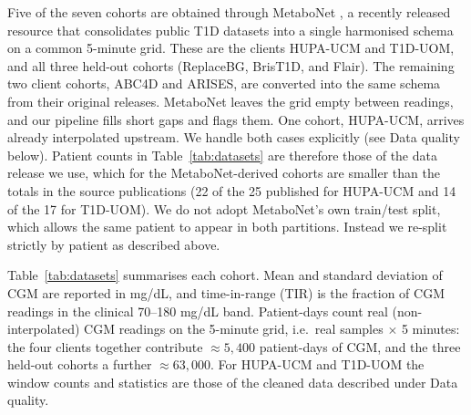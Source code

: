 \documentclass[10pt,letterpaper]{article}
\begin{document}
Five of the seven cohorts are obtained through MetaboNet
\cite{wolff2026metabonet}, a recently released resource that consolidates
public T1D datasets into a single harmonised schema on a common 5-minute grid.
These are the clients HUPA-UCM and T1D-UOM, and all three held-out cohorts
(ReplaceBG, BrisT1D, and Flair). The remaining two client cohorts, ABC4D and
ARISES, are converted into the same schema from their original releases.
MetaboNet leaves the grid empty between readings, and our pipeline fills short
gaps and flags them. One cohort, HUPA-UCM, arrives already interpolated
upstream. We handle both cases explicitly (see Data quality below). Patient
counts in
Table~\ref{tab:datasets} are therefore those of the data release we use, which
for the MetaboNet-derived cohorts are smaller than the totals in the source
publications (22 of the 25 published for HUPA-UCM and 14 of the 17 for
T1D-UOM). We do not adopt MetaboNet's own train/test split, which allows the
same patient to appear in both partitions. Instead we re-split strictly by
patient as described above.

Table~\ref{tab:datasets} summarises each cohort. Mean and standard deviation of
CGM are reported in mg/dL, and time-in-range (TIR) is the fraction of CGM
readings in the clinical 70--180 mg/dL band. Patient-days count real
(non-interpolated) CGM readings on the 5-minute grid, i.e.\ real samples
$\times$ 5 minutes: the four clients together contribute
$\approx 5{,}400$ patient-days of CGM, and the three held-out cohorts a
further $\approx 63{,}000$. For HUPA-UCM and T1D-UOM the
window counts and statistics are those of the cleaned data described under
Data quality.
\end{document}

